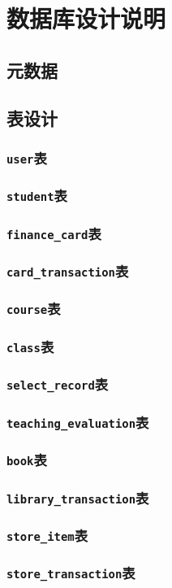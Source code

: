 \ifx\maindoc\undefined
{}
\fi

\section{数据库设计说明}
\subsection{元数据}
\subsection{表设计}
\subsubsection{\texttt{user}表}
\subsubsection{\texttt{student}表}
\subsubsection{\texttt{finance\_card}表}
\subsubsection{\texttt{card\_transaction}表}
\subsubsection{\texttt{course}表}
\subsubsection{\texttt{class}表}
\subsubsection{\texttt{select\_record}表}
\subsubsection{\texttt{teaching\_evaluation}表}
\subsubsection{\texttt{book}表}
\subsubsection{\texttt{library\_transaction}表}
\subsubsection{\texttt{store\_item}表}
\subsubsection{\texttt{store\_transaction}表}
